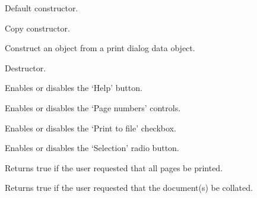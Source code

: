 
Default constructor.


Copy constructor.


Construct an object from a print dialog data object.


\label{wxprintdialogdatadtor}


Destructor.


\label{wxprintdialogdataenablehelp}


Enables or disables the `Help' button.


\label{wxprintdialogdataenablepagenumbers}


Enables or disables the `Page numbers' controls.


\label{wxprintdialogdataenableprinttofile}


Enables or disables the `Print to file' checkbox.


\label{wxprintdialogdataenableselection}


Enables or disables the `Selection' radio button.


\label{wxprintdialogdatagetallpages}


Returns true if the user requested that all pages be printed.


\label{wxprintdialogdatagetcollate}


Returns true if the user requested that the document(s) be collated.


